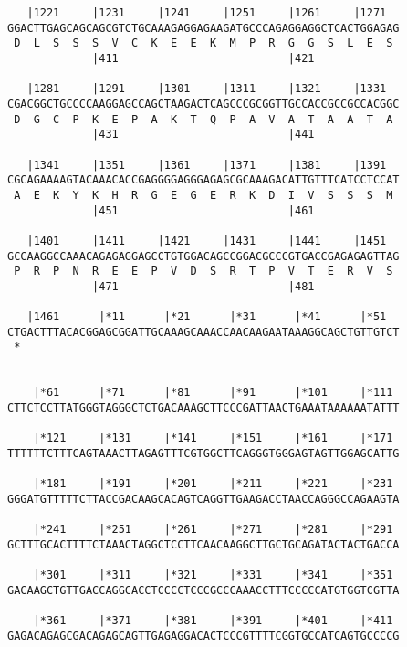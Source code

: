 \documentclass{article}
\begin{document}
\begin{Verbatim}
   |1221     |1231     |1241     |1251     |1261     |1271  
GGACTTGAGCAGCAGCGTCTGCAAAGAGGAGAAGATGCCCAGAGGAGGCTCACTGGAGAG
 D  L  S  S  S  V  C  K  E  E  K  M  P  R  G  G  S  L  E  S 
             |411                          |421             
  
   |1281     |1291     |1301     |1311     |1321     |1331  
CGACGGCTGCCCCAAGGAGCCAGCTAAGACTCAGCCCGCGGTTGCCACCGCCGCCACGGC
 D  G  C  P  K  E  P  A  K  T  Q  P  A  V  A  T  A  A  T  A 
             |431                          |441             
  
   |1341     |1351     |1361     |1371     |1381     |1391  
CGCAGAAAAGTACAAACACCGAGGGGAGGGAGAGCGCAAAGACATTGTTTCATCCTCCAT
 A  E  K  Y  K  H  R  G  E  G  E  R  K  D  I  V  S  S  S  M 
             |451                          |461             
  
   |1401     |1411     |1421     |1431     |1441     |1451  
GCCAAGGCCAAACAGAGAGGAGCCTGTGGACAGCCGGACGCCCGTGACCGAGAGAGTTAG
 P  R  P  N  R  E  E  P  V  D  S  R  T  P  V  T  E  R  V  S 
             |471                          |481             
  
   |1461      |*11      |*21      |*31      |*41      |*51  
CTGACTTTACACGGAGCGGATTGCAAAGCAAACCAACAAGAATAAAGGCAGCTGTTGTCT
 *   
                                                            
  
    |*61      |*71      |*81      |*91      |*101     |*111 
CTTCTCCTTATGGGTAGGGCTCTGACAAAGCTTCCCGATTAACTGAAATAAAAAATATTT
                                                            
    |*121     |*131     |*141     |*151     |*161     |*171 
TTTTTTCTTTCAGTAAACTTAGAGTTTCGTGGCTTCAGGGTGGGAGTAGTTGGAGCATTG
                                                            
    |*181     |*191     |*201     |*211     |*221     |*231 
GGGATGTTTTTCTTACCGACAAGCACAGTCAGGTTGAAGACCTAACCAGGGCCAGAAGTA
                                                            
    |*241     |*251     |*261     |*271     |*281     |*291 
GCTTTGCACTTTTCTAAACTAGGCTCCTTCAACAAGGCTTGCTGCAGATACTACTGACCA
                                                            
    |*301     |*311     |*321     |*331     |*341     |*351 
GACAAGCTGTTGACCAGGCACCTCCCCTCCCGCCCAAACCTTTCCCCCATGTGGTCGTTA
                                                            
    |*361     |*371     |*381     |*391     |*401     |*411 
GAGACAGAGCGACAGAGCAGTTGAGAGGACACTCCCGTTTTCGGTGCCATCAGTGCCCCG
                                                            

\end{Verbatim}
\end{document}
